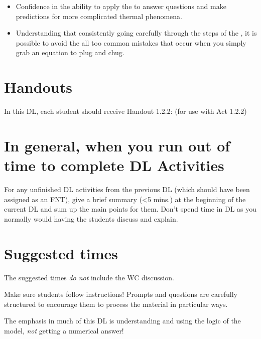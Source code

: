 \begin{itemize}
	\item Confidence in the ability to apply the \EnergyInteractionModel{} to answer questions and make predictions for more complicated thermal phenomena.
	\item Understanding that consistently going carefully through the steps of the \EnergyInteractionModel{}, it is possible to avoid the all too common mistakes that occur when you simply grab an equation to plug and chug.
\end{itemize}

\section*{Handouts}

In this DL, each student should receive Handout 1.2.2:  (for use with Act 1.2.2)

\section*{In general, when you run out of time to complete DL Activities}
	
	For any unfinished DL activities from the previous DL (which should have been assigned as an FNT), give a brief summary (\textless 5 mins.) at the beginning of the current DL and sum up the main points for them. Don't spend time in DL as you normally would having the students discuss and explain.
	
\section*{Suggested times}
	
The suggested times {\em do not} include the WC discussion.

\vspace*{1cm}
Make sure students follow instructions! Prompts and questions are carefully structured to encourage them to process the material in particular ways.

\vspace*{1cm}
\begin{mdframed}
The emphasis in much of this DL is understanding and using the logic of the model, {\em not} getting a numerical answer!
\end{mdframed}